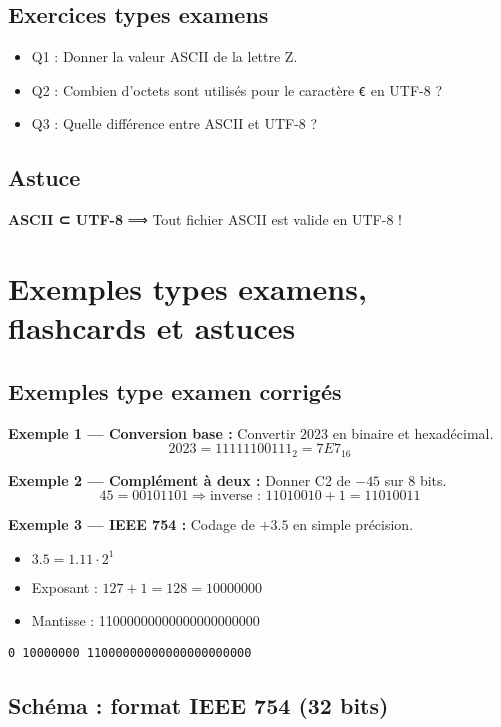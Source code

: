 \documentclass[12pt,a4paper]{article}
\begin{document}
\subsection{Exercices types examens}
\begin{itemize}
  \item Q1 : Donner la valeur ASCII de la lettre Z.
  \item Q2 : Combien d’octets sont utilisés pour le caractère \texttt{€} en UTF-8 ?
  \item Q3 : Quelle différence entre ASCII et UTF-8 ?
\end{itemize}

\subsection{Astuce}
\textbf{ASCII ⊂ UTF-8} ⟹ Tout fichier ASCII est valide en UTF-8 !

\newpage

\section{Exemples types examens, flashcards et astuces}

\subsection{Exemples type examen corrigés}
\textbf{Exemple 1 — Conversion base :} Convertir $2023$ en binaire et hexadécimal.
\[ 2023 = 11111100111_2 = 7E7_{16} \]

\textbf{Exemple 2 — Complément à deux :} Donner C2 de $-45$ sur 8 bits.
\[ 45 = 00101101 \Rightarrow \text{inverse : } 11010010 + 1 = 11010011 \]

\textbf{Exemple 3 — IEEE 754 :} Codage de $+3.5$ en simple précision.
\begin{itemize}
  \item $3.5 = 1.11 \cdot 2^1$
  \item Exposant : $127 + 1 = 128 = 10000000$
  \item Mantisse : 11000000000000000000000
\end{itemize}
\texttt{0 10000000 11000000000000000000000}

\subsection{Schéma : format IEEE 754 (32 bits)}
\begin{center}
\end{center}
\end{document}
